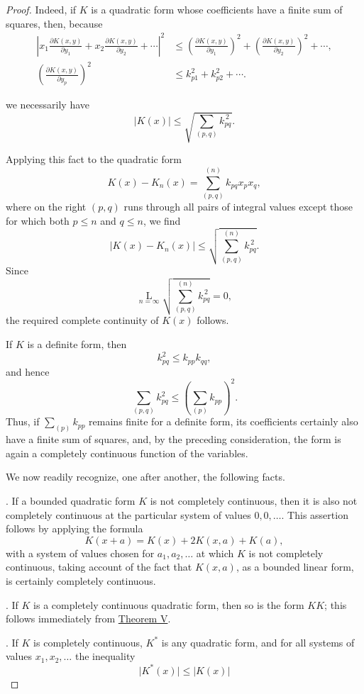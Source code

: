 \documentclass[b5paper,twoside]{article}
\newcommand{\originalpage}[1]{\phantomsection\label{origpage:#1}}
\begin{document}
\begin{proof}
Indeed, if $K$ is a quadratic form whose coefficients have a finite sum of
squares, then, because
\[
\begin{aligned}
  \left\lvert
    x_1\frac{\partial K(x,y)}{\partial y_1}
    +x_2\frac{\partial K(x,y)}{\partial y_2}+\cdots
  \right\rvert^2
  &\le
  \left(\frac{\partial K(x,y)}{\partial y_1}\right)^2
  +\left(\frac{\partial K(x,y)}{\partial y_2}\right)^2+\cdots,\\[0.4em]
  \left(\frac{\partial K(x,y)}{\partial y_p}\right)^2
  &\le k_{p1}^2+k_{p2}^2+\cdots.
\end{aligned}
\]
\begin{samepage}
we necessarily have\originalpage{204}
\[
  \lvert K(x)\rvert
  \le\sqrt{\sum_{(p,q)}k_{pq}^{\,2}}.
\]
\end{samepage}
Applying this fact to the quadratic form
\[
  K(x)-K_n(x)=\sum_{(p,q)}^{(n)}k_{pq}x_p x_q,
\]
where on the right $(p,q)$ runs through all pairs of integral values except
those for which both $p\le n$ and $q\le n$, we find
\[
  \lvert K(x)-K_n(x)\rvert
  \le\sqrt{\sum_{(p,q)}^{(n)}k_{pq}^{\,2}}.
\]
Since
\[
  \mathop{\mathrm{L}}\limits_{n=\infty}
  \sqrt{\sum_{(p,q)}^{(n)}k_{pq}^{\,2}}=0,
\]
the required complete continuity of $K(x)$ follows.

If $K$ is a definite form, then
\[
  k_{pq}^2\le k_{pp}k_{qq},
\]
and hence
\[
  \sum_{(p,q)}k_{pq}^2\le\left(\sum_{(p)}k_{pp}\right)^2.
\]
Thus, if $\sum_{(p)}k_{pp}$ remains finite for a definite form, its
coefficients certainly also have a finite sum of squares, and, by the
preceding consideration, the form is again a completely continuous function
of the variables.

We now readily recognize, one after another, the following facts.

. If a bounded quadratic form $K$ is not completely continuous,
then it is also not completely continuous at the particular system of values
$0,0,\ldots$.  This assertion follows by applying the formula
\[
  K(x+a)=K(x)+2K(x,a)+K(a),
\]
with a system of values chosen for $a_1,a_2,\ldots$ at which $K$ is not
completely continuous, taking account of the fact that $K(x,a)$, as a bounded
linear form, is certainly completely continuous.

. If $K$ is a completely continuous quadratic form, then so is
the form $KK$; this follows immediately from \hyperref[thm:V]{Theorem V}.

. If $K$ is completely continuous, $K^*$ is any quadratic form,
and for all systems of values $x_1,x_2,\ldots$ the inequality
\[
  \lvert K^*(x)\rvert\le\lvert K(x)\rvert
\]


\end{proof}
\end{document}
